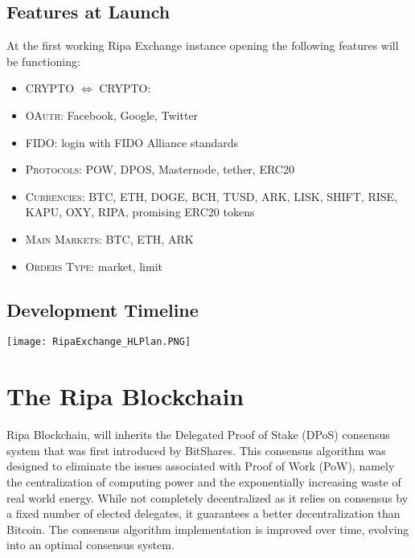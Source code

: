\documentclass[11pt,fleqn,oneside]{book} %
\begin{document}
\subsection{Features at Launch}
At the first working Ripa Exchange instance opening the following features will be functioning:
\begin{itemize}
	\item \textsc{CRYPTO $\Leftrightarrow$ CRYPTO}:
	\item \textsc{OAuth}: Facebook, Google, Twitter
	\item \textsc{FIDO}: login with FIDO Alliance standards
	\item \textsc{Protocols}: POW, DPOS, Masternode, tether, ERC20
	\item \textsc{Currencies}: BTC, ETH, DOGE, BCH, TUSD, ARK, LISK, SHIFT, RISE, KAPU, OXY, RIPA, promising ERC20 tokens
	\item \textsc{Main Markets}: BTC, ETH, ARK
	\item \textsc{Orders Type}: market, limit
\end{itemize}

\subsection{Development Timeline}
\begin{center}
	\texttt{[image: RipaExchange\_HLPlan.PNG]}
\end{center}

\section{The Ripa Blockchain}
Ripa Blockchain, will inherits the Delegated Proof of Stake (DPoS) consensus system that was first introduced
by BitShares. This consensus algorithm was designed to eliminate the issues associated with Proof of Work (PoW), 
namely the centralization of computing power and the exponentially increasing waste of real world energy. While not
completely decentralized as it relies on consensus by a fixed number of elected delegates, it guarantees a better decentralization 
than Bitcoin. The consensus algorithm implementation is improved over time, evolving into an optimal consensus system.\\
\end{document}
